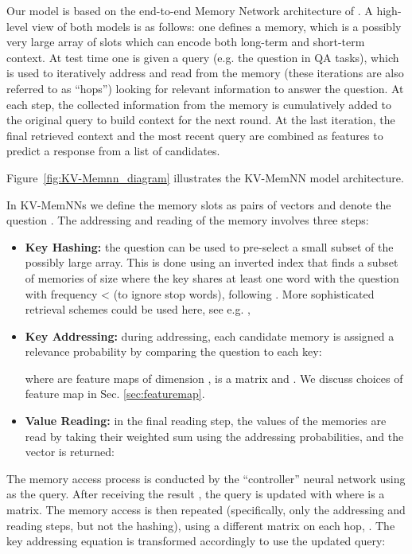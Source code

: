 \documentclass[11pt,letterpaper]{article}
\begin{document}
Our model is based on
 the end-to-end Memory Network  architecture of \cite{sukhbaatar2015end}.
A high-level view of both models is as follows:
one defines a memory, which is a possibly very large array of slots
 which can encode both long-term
and short-term context.
At test time one is given a query (e.g. the question in QA tasks), which is used to iteratively address and read from the memory (these iterations are also referred to as ``hops'') looking for relevant information to answer the question. At each step, the collected information from the memory is cumulatively added to the original query to build context for the next round. At the last iteration, the final retrieved context and the most recent query are combined as features to predict a response from a list of candidates.

Figure~\ref{fig:KV-Memnn_diagram} illustrates the KV-MemNN model architecture.

In KV-MemNNs we define  the memory slots as pairs of vectors 
and denote the question .
The addressing and reading of the memory
 involves three steps:
\begin{itemize}
\item {\bf Key Hashing:}
 the question can be
 used to pre-select a small subset of the possibly large array. This is done
using an inverted index that finds a subset 
 of memories of size  where the key shares at
least one word with the question with frequency <  (to ignore stop words),
 following \cite{dodge2015evaluating}.
More sophisticated
retrieval schemes could be used here, see e.g. \cite{manning2008introduction},
\item {\bf Key Addressing:} during addressing, each candidate memory is assigned a relevance probability by comparing the question to each key:

where  are feature maps of dimension ,  is a  matrix
and  .
We discuss choices of feature map in Sec. \ref{sec:featuremap}.

\item {\bf Value Reading:} in the final reading step, the values of the memories are read by taking their weighted sum using the addressing probabilities, and the vector  is returned:

\end{itemize}

The memory access process is conducted  by the ``controller'' neural network
 using  as the query.
After receiving the result , the query is updated with  where  is a  matrix. The memory access is then repeated (specifically, only the addressing and reading steps, but not the hashing), using a different matrix  on each hop, . The key addressing equation is transformed accordingly to use the updated query:
\end{document}

